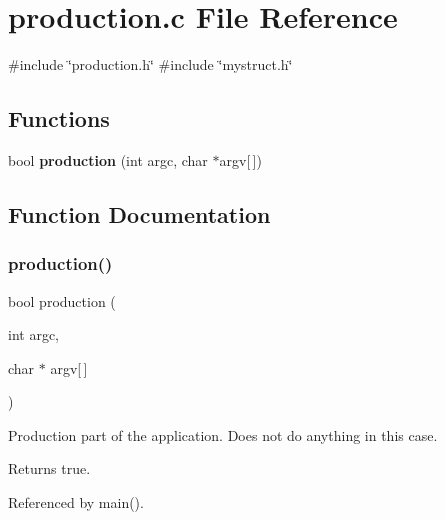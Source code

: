 \section{production.\+c File Reference}
\label{production_8c}
{\ttfamily \#include \char`\"{}production.\+h\char`\"{}}\newline
{\ttfamily \#include \char`\"{}mystruct.\+h\char`\"{}}\newline
\subsection*{Functions}
\begin{DoxyCompactItemize}
\item 
bool \textbf{ production} (int argc, char $\ast$argv[$\,$])
\end{DoxyCompactItemize}


\subsection{Function Documentation}
\mbox{\label{production_8c_a9f67b51c42a54745557e7a2c9c07c46f}} 
\subsubsection{production()}
{\footnotesize\ttfamily bool production (\begin{DoxyParamCaption}\item[{int}]{argc,  }\item[{char $\ast$}]{argv[$\,$] }\end{DoxyParamCaption})}

Production part of the application. Does not do anything in this case. \begin{DoxyReturn}{Returns}
true. 
\end{DoxyReturn}


Referenced by main().

